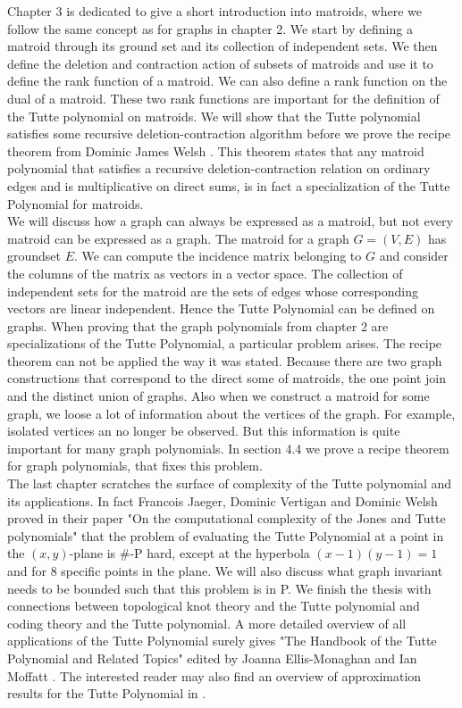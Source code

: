 \documentclass[12pt,a4paper, twoside, autooneside=false]{scrartcl}
\theoremstyle{definition}
\theoremstyle{remark}
\numberwithin{equation}{section}
\begin{document}
\indent Chapter 3 is dedicated to give a short introduction into matroids, where we follow the same concept as for graphs in chapter 2. We start by defining a matroid through its ground set and its collection of independent sets. 
We then define the deletion and contraction action of subsets of matroids and use it to define the rank function of a matroid. We can also define a rank function on the dual of a matroid. These two rank functions are important for the definition of the Tutte polynomial on matroids. We will show that the Tutte polynomial satisfies some recursive deletion-contraction algorithm before we prove the recipe theorem from Dominic James Welsh \cite{We1999}. This theorem states that any matroid polynomial that satisfies a recursive deletion-contraction relation on ordinary edges and is multiplicative on direct sums, is in fact a specialization of the Tutte Polynomial for matroids. \\
\indent We will discuss how a graph can always be expressed as a matroid, but not every matroid can be expressed as a graph. The matroid for a graph $G = (V,E)$ has groundset $E$. We can compute the incidence matrix belonging to $G$ and consider the columns of the matrix as vectors in a vector space. The collection of independent sets for the matroid are the sets of edges whose corresponding vectors are linear independent. Hence the Tutte Polynomial can be defined on graphs. When proving that the graph polynomials from chapter 2 are specializations of the Tutte Polynomial, a particular problem arises. The recipe theorem can not be applied the way it was stated. Because there are two graph constructions that correspond to the direct some of matroids, the one point join and the distinct union of graphs. Also when we construct a matroid for some graph, we loose a lot of information about the vertices of the graph. For example, isolated vertices an no longer be observed. But this information is quite important for many graph polynomials. In section 4.4 we prove a recipe theorem for graph polynomials, that fixes this problem. \\
The last chapter scratches the surface of complexity of the Tutte polynomial and its applications. In fact Francois Jaeger, Dominic Vertigan and Dominic Welsh proved in their paper "On the computational complexity of the Jones and Tutte polynomials" \cite{JaVeWe1990} that the problem of evaluating the Tutte Polynomial at a point in the $(x,y)$-plane is $\#$-P hard, except at the hyperbola $(x - 1)(y - 1) = 1$ and for 8 specific points in the plane. We will also discuss what graph invariant needs to be bounded such that this problem is in P. We finish the thesis with connections between topological knot theory and the Tutte polynomial and coding theory and the Tutte polynomial. A more detailed overview of all applications of the Tutte Polynomial surely gives "The Handbook of the Tutte Polynomial and Related Topics" edited by Joanna Ellis-Monaghan and Ian Moffatt \cite{ElMo2022}. The interested reader may also find an overview of approximation results for the Tutte Polynomial in \cite{ElMo2022}. 
\newpage
\end{document}
